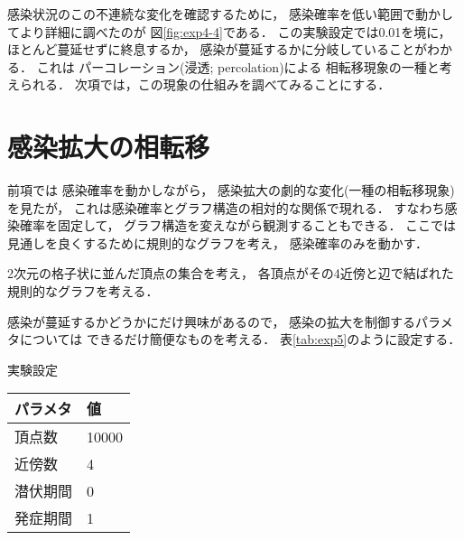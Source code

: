 \documentclass[10pt,oneside]{scrartcl}
\begin{document}
\begin{figure*}%
  \centering
\end{figure*}

感染状況のこの不連続な変化を確認するために，
感染確率を低い範囲で動かしてより詳細に調べたのが
図\ref{fig:exp4-4}である．
この実験設定では0.01を境に，
ほとんど蔓延せずに終息するか，
感染が蔓延するかに分岐していることがわかる．
これは
パーコレーション(浸透; percolation)による
相転移現象の一種と考えられる．
次項では，この現象の仕組みを調べてみることにする．

\begin{figure*}%
  \centering
\end{figure*}

\section{感染拡大の相転移}
\label{sec:org8c44275}

前項では
感染確率を動かしながら，
感染拡大の劇的な変化(一種の相転移現象)を見たが，
これは感染確率とグラフ構造の相対的な関係で現れる．
すなわち感染確率を固定して，
グラフ構造を変えながら観測することもできる．
ここでは
見通しを良くするために規則的なグラフを考え，
感染確率のみを動かす．


2次元の格子状に並んだ頂点の集合を考え，
各頂点がその4近傍と辺で結ばれた規則的なグラフを考える．

感染が蔓延するかどうかにだけ興味があるので，
感染の拡大を制御するパラメタについては
できるだけ簡便なものを考える．
表\ref{tab:exp5}のように設定する．

\begin{margintable}
  \caption{実験設定}
  \label{tab:exp5}
  \small
  \begin{tabular}{ll}
    \toprule
    パラメタ&値 \\
    \midrule
    頂点数&10000 \\
    近傍数&4 \\
    潜伏期間&0 \\
    発症期間&1 \\
    \bottomrule
  \end{tabular}
\end{margintable}
\end{document}
